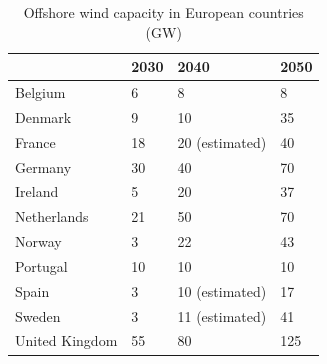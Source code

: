 \documentclass[sn-mathphys,Numbered]{sn-jnl}%
\theoremstyle{plain}%
\theoremstyle{definition}%
\theoremstyle{remark}%
\begin{document}
\begin{table}[tbp]
\centering
\caption{Offshore wind capacity in European countries (GW)}
\label{tab owf capacity}
\begin{tabular}{llll}
\hline
               & 2030       & 2040       & 2050      \\ \hline
Belgium        & 6 \cite{NSOG}       & 8 \cite{NSOG}         & 8 \cite{NSOG}         \\
Denmark        & 9 \cite{Offshorewindfarmstenderedtowards2030}          & 10 \cite{EnergyIslandintheNorthSea}        & 35 \cite{NSOG}       \\
France         & 18 \cite{FrancepassesRenewable}        & 20 (estimated)         & 40 \cite{Francecommitsto40}       \\
Germany        & 30 \cite{Morewindenergyatsea}        & 40 \cite{Morewindenergyatsea}        & 70 \cite{Morewindenergyatsea}       \\
Ireland        & 5 \cite{FutureFrameworkforOffshoreRenewableEnergy}         & 20 \cite{FutureFrameworkforOffshoreRenewableEnergy}        & 37 \cite{FutureFrameworkforOffshoreRenewableEnergy}       \\
Netherlands    & 21 \cite{Offshorewindenergy}       & 50 \cite{NetherlandsSets70GW}        & 70 \cite{NetherlandsSets70GW}        \\
Norway         & 3  \cite{300GWNorthSea}        & 22 \cite{ENERGYTRANSITIONNORWAY2023}        & 43 \cite{ENERGYTRANSITIONNORWAY2023}       \\
Portugal       & 10 \cite{Portugaltolaunch}        & 10 \cite{Atlantic}        & 10 \cite{Atlantic}       \\
Spain          & 3  \cite{Spainissuesplan}        & 10 (estimated)          & 17 \cite{Spainrepresents}        \\
Sweden         & 3  \cite{FinlandDenmarkSweden}        & 11 (estimated) \cite{Roadmap2040}         & 41 \cite{Offshorewinddevelopment}       \\
United Kingdom & 55  \cite{Offshorewindnetzero}       & 80 \cite{Offshorewindnetzero}        & 125 \cite{Offshorewindnetzero}      \\ \hline
\end{tabular}
\end{table}
\end{document}
